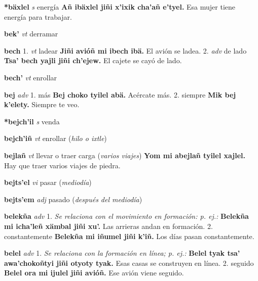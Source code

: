 \documentclass[10pt]{scrbook}
\newcommand{\entry}[1]{\textbf{#1}}
\newcommand{\onedefinition}[1]{#1.}
\newcommand{\nontranslationdef}[1]{\textit{#1}}
\newcommand{\partofspeech}[1]{\textit{#1}}
\newcommand{\spanishtranslation}[1]{#1}
\newcommand{\clarification}[1]{(\textit{#1})}
\newcommand{\cholexample}[1]{\textbf{#1}}
\newcommand{\exampletranslation}[1]{#1}
\begin{document}
\begin{multicols}{2}
\entry{*bäxlel}
\partofspeech{s}
\spanishtranslation{energía}
\cholexample{Añ ibäxlel jiñi x'ixik cha'añ e'tyel.}
\exampletranslation{Esa mujer tiene energía para trabajar.}

\entry{bek'}
\partofspeech{vt}
\spanishtranslation{derramar}

\entry{bech}
\onedefinition{1}
\partofspeech{vt}
\spanishtranslation{ladear}
\cholexample{Jiñi avióñ mi ibech ibä.}
\exampletranslation{El avión se ladea.}
\onedefinition{2}
\partofspeech{adv}
\spanishtranslation{de lado}
\cholexample{Tsa' bech yajli jiñi ch'ejew.}
\exampletranslation{El cajete se cayó de lado.}

\entry{bech'}
\partofspeech{vt}
\spanishtranslation{enrollar}

\entry{bej}
\partofspeech{adv}
\onedefinition{1}
\spanishtranslation{más}
\cholexample{Bej choko tyilel abä.}
\exampletranslation{Acércate más.}
\onedefinition{2}
\spanishtranslation{siempre}
\cholexample{Mik bej k'elety.}
\exampletranslation{Siempre te veo.}

\entry{*bejch'il}
\partofspeech{s}
\spanishtranslation{venda}

\entry{bejch'iñ}
\partofspeech{vt}
\spanishtranslation{enrollar}
\clarification{hilo o ixtle}

\entry{bejlañ}
\partofspeech{vt}
\spanishtranslation{llevar o traer carga}
\clarification{varios viajes}
\cholexample{Yom mi abejlañ tyilel xajlel.}
\exampletranslation{Hay que traer varios viajes de piedra.}

\entry{bejts'el}
\partofspeech{vi}
\spanishtranslation{pasar}
\clarification{mediodía}

\entry{bejts'em}
\partofspeech{adj}
\spanishtranslation{pasado}
\clarification{después del mediodía}

\entry{belekña}
\partofspeech{adv}
\onedefinition{1}
\nontranslationdef{Se relaciona con el movimiento en formación: p. ej.:}
\cholexample{Belekña mi icha'leñ xämbal jiñi xu'.}
\exampletranslation{Las arrieras andan en formación.}
\onedefinition{2}
\spanishtranslation{constantemente}
\cholexample{Belekña mi iñumel jiñi k'iñ.}
\exampletranslation{Los días pasan constantemente.}

\entry{belel}
\partofspeech{adv}
\onedefinition{1}
\nontranslationdef{Se relaciona con la formación en línea; p. ej.:}
\cholexample{Belel tyak tsa' awa'chokoñtyi jiñi otyoty tyak.}
\exampletranslation{Esas casas se construyen en línea.}
\onedefinition{2}
\spanishtranslation{seguido}
\cholexample{Belel ora mi ijulel jiñi avióñ.}
\exampletranslation{Ese avión viene seguido.}


\end{multicols}
\end{document}
